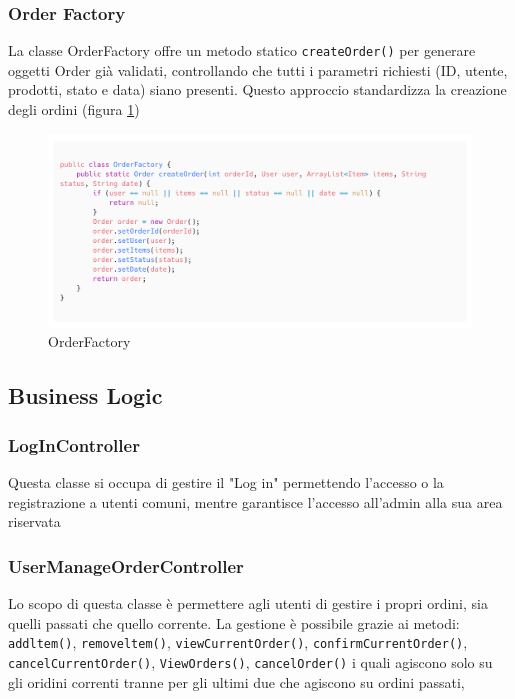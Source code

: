 \documentclass{article}
\begin{document}
\subsubsection{Order Factory}
La classe OrderFactory offre un metodo statico \texttt{createOrder()} per generare oggetti Order già validati, controllando che tutti i parametri richiesti (ID, utente, prodotti, stato e data) siano presenti. Questo approccio standardizza la creazione degli ordini (figura \ref{orderFactory})


\begin{figure}[h]
    \includegraphics[width=1.0\linewidth]{imgs/snippets/Code_OrderFactory.png}
    \caption{OrderFactory}
    \label{orderFactory}
\end{figure}

\newpage
\subsection{Business Logic}

\subsubsection{LogInController}
Questa classe si occupa di gestire il "Log in" permettendo l'accesso o la registrazione a utenti comuni, mentre garantisce l'accesso all'admin alla sua area riservata

\subsubsection{UserManageOrderController}
Lo scopo di questa classe è permettere agli utenti di gestire i propri ordini, sia quelli passati che quello corrente. La gestione è possibile grazie ai metodi: \texttt{addltem()}, \texttt{removeltem()}, \texttt{viewCurrentOrder()}, \texttt{confirmCurrentOrder()}, \\ \texttt{cancelCurrentOrder()}, \texttt{ViewOrders()}, \texttt{cancelOrder()} i quali agiscono solo su gli oridini correnti tranne per gli ultimi due che agiscono su ordini passati,
\end{document}
